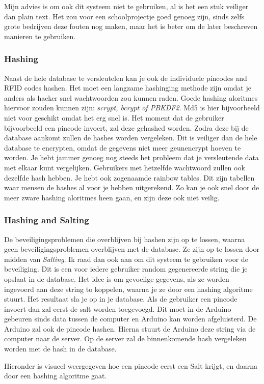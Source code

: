 \documentclass{article}
\begin{document}
Mijn advies is om ook dit systeem niet te gebruiken, al is het een stuk veiliger dan plain text.
Het zou voor een schoolprojectje goed genoeg zijn, sinds zelfs grote bedrijven deze fouten nog maken, maar het is beter om de later beschreven manieren te gebruiken.

\newpage

\subsubsection{Hashing}

Naast de hele database te versleutelen kan je ook de individuele pincodes and RFID codes hashen.
Het moet een langzame hashinging methode zijn omdat je anders als hacker snel wachtwoorden zou kunnen raden.
Goede hashing aloritmes hiervoor zouden kunnen zijn: \emph{scrypt, bcrypt of PBKDF2}.
Md5 is hier bijvoorbeeld niet voor geschikt omdat het erg snel is.
Het moment dat de gebruiker bijvoorbeeld een pincode invoert, zal deze gehashed worden.
Zodra deze bij de database aankomt zullen de hashes worden vergeleken.
Dit is veiliger dan de hele database te encrypten, omdat de gegevens niet meer geunencrypt hoeven te worden.
Je hebt jammer genoeg nog steeds het probleem dat je versleutende data met elkaar kunt vergelijken.
Gebruikers met hetzelfde wachtwoord zullen ook dezelfde hash hebben.
Je hebt ook zogenaamde rainbow tables.
Dit zijn tabellen waar mensen de hashes al voor je hebben uitgerekend.
Zo kan je ook snel door de meer zware hashing aloritmes heen gaan, en zijn deze ook niet veilig.

\hfill

\centerline{  }

\subsubsection{Hashing and Salting}

De beveiligingsproblemen die overblijven bij hashen zijn op te lossen, waarna geen beveiligingsproblemen overblijven met de database.
Ze zijn op te lossen door midden van \emph{Salting}.
Ik raad dan ook aan om dit systeem te gebruiken voor de beveiliging.
Dit is een voor iedere gebruiker random gegenereerde string die je opslaat in de database.
Het idee is om gevoelige gegevens, als ze worden ingevoerd aan deze string to koppelen, waarna je ze door een hashing algoritme stuurt.
Het resultaat sla je op in je database.
Als de gebruiker een pincode invoert dan zal eerst de salt worden toegevoegd.
Dit moet in de Arduino gebeuren sinds data tussen de computer en Arduino kan worden afgeluisterd.
De Arduino zal ook de pincode hashen.
Hierna stuurt de Arduino deze string via de computer naar de server.
Op de server zal de binnenkomende hash vergeleken worden met de hash in de database.

Hieronder is visueel weergegeven hoe een pincode eerst een Salt krijgt, en daarna door een hashing algoritme gaat.

\hfill

\centerline{  }
\end{document}

